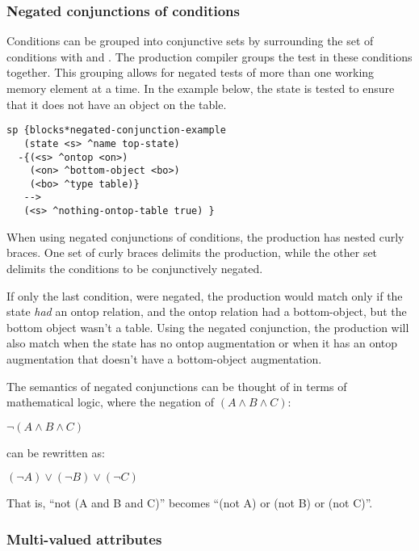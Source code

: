 \subsubsection{Negated conjunctions of conditions}
\label{SYNTAX-pm-negaconj}      %

Conditions can be grouped into conjunctive sets by surrounding the set of
conditions with \soar{\{} and \soar{\}}. The production compiler groups the
test in these conditions together. This grouping allows for negated tests of
more than one working memory element at a time. In the example below, the
state is tested to ensure that it does not have an object on the table. 

\begin{verbatim}
sp {blocks*negated-conjunction-example
   (state <s> ^name top-state)
  -{(<s> ^ontop <on>)
    (<on> ^bottom-object <bo>)
    (<bo> ^type table)}
   -->
   (<s> ^nothing-ontop-table true) } 
\end{verbatim}

When using negated conjunctions of conditions, the production has
nested curly braces. One set of curly braces delimits the production, while
the other set delimits the conditions to be conjunctively negated.

If only the last condition,  were negated, the
production would match only if the state \emph{had} an ontop relation, and the
ontop relation had a bottom-object, but the bottom object wasn't a table.
Using the negated conjunction, the production will also match when the state
has no ontop augmentation or when it has an ontop augmentation that doesn't
have a bottom-object augmentation.

The semantics of negated conjunctions can be thought of in terms of
mathematical logic, where the negation of $(A \wedge B \wedge C)$:

$\neg (A \wedge B \wedge C)$

can be rewritten as:

$(\neg A) \vee (\neg B) \vee (\neg C)$

That is, ``not (A and B and C)'' becomes ``(not A) or (not B) or (not C)''.



\subsubsection{Multi-valued attributes}
\label{SYNTAX-pm-multi}

